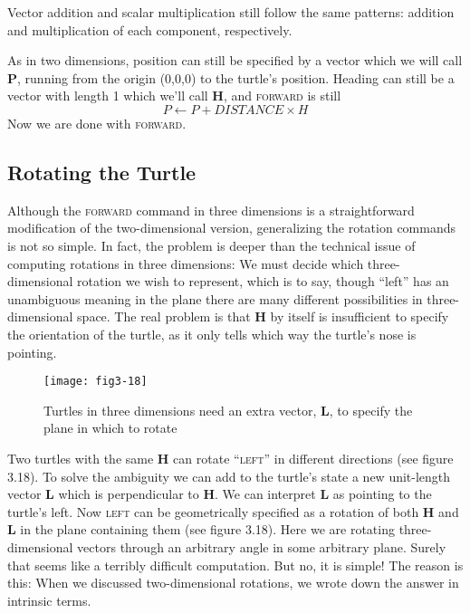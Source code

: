 \documentclass{book}
\begin{document}
Vector addition and scalar multiplication still follow the same patterns:
addition and multiplication of each component, respectively.

As in two dimensions, position can still be specified by a vector which
we will call \textbf{P}, running from the origin (0,0,0) to the turtle's position.
Heading can still be a vector with length 1 which we'll call \textbf{H}, and
\textsc{forward} is still
$$P \leftarrow P + DISTANCE \times H$$ Now we are done with \textsc{forward}.

\subsection{Rotating the Turtle}

Although the \textsc{forward} command in three dimensions is a straightforward
modification of the two-dimensional version, generalizing the rotation
commands is not so simple. In fact, the problem is deeper than the
technical issue of computing rotations in three dimensions: We must
decide which three-dimensional rotation we wish to represent, which is
to say, though ``left'' has an unambiguous meaning in the plane there
are many different possibilities in three-dimensional space.
The real problem is that \textbf{H} by itself is insufficient to specify the
orientation of the turtle, as it only tells which way the turtle's nose is
pointing.

\begin{figure}
\begin{center}
\texttt{[image: fig3-18]}
\caption{Turtles in three dimensions need an extra vector, \textbf{L}, to specify the plane in which to rotate}
\end{center}
\end{figure}


Two turtles with the same \textbf{H} can rotate ``\textsc{left}'' in different directions (see
figure 3.18). To solve the ambiguity we can add to the turtle's state a new
unit-length vector \textbf{L} which is perpendicular to \textbf{H}. We can interpret \textbf{L} as
pointing to the turtle's left. Now \textsc{left} can be geometrically specified as
a rotation of both \textbf{H} and \textbf{L} in the plane containing them (see figure 3.18).
Here we are rotating three-dimensional vectors through an arbitrary
angle in some arbitrary plane. Surely that seems like a terribly difficult
computation. But no, it is simple! The reason is this: When we discussed
two-dimensional rotations, we wrote down the answer in intrinsic terms.
\end{document}
